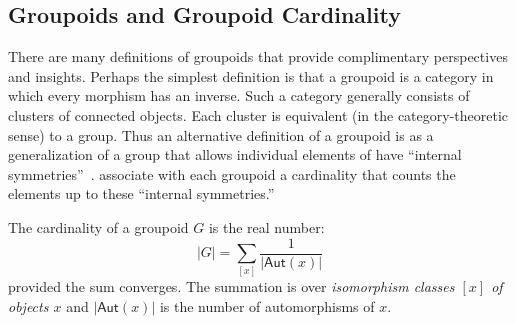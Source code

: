 \subsection{Groupoids and Groupoid Cardinality}

There are many definitions of groupoids that provide complimentary
perspectives and insights. Perhaps the simplest definition is that a
groupoid is a category in which every morphism has an inverse. Such a
category generally consists of clusters of connected objects. Each
cluster is equivalent (in the category-theoretic sense) to a
group. Thus an alternative definition of a groupoid is as a
generalization of a group that allows individual elements of have
``internal
symmetries''~\cite{groupoidintro}. \citet{2009arXiv0908.4305B}
associate with each groupoid a cardinality that counts the elements up
to these ``internal symmetries.''

\begin{definition}
  The cardinality of a groupoid $G$ is the real number:
  \[
    |G| = \sum_{[x]} \frac{1}{|\textsf{Aut}(x)|}
  \]
  provided the sum converges. The summation is over \emph{isomorphism
    classes $[x]$ of objects $x$} and $|\textsf{Aut}(x)|$ is the
  number of automorphisms of $x$.
\end{definition}

